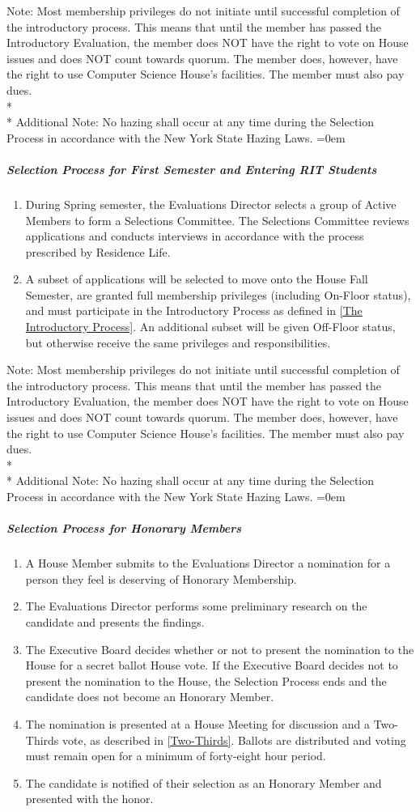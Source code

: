 \documentclass{article}
\newcommand{\asubsubsubsection}[1]{\parindent=0em\subparagraph{#1} \label{#1}}
\begin{document}
Note: Most membership privileges do not initiate until successful completion of the introductory process.
This means that until the member has passed the Introductory Evaluation, the member does NOT have the right to vote on House issues and does NOT count towards quorum.
The member does, however, have the right to use Computer Science House's facilities.
The member must also pay dues.
\\* \\*
Additional Note: No hazing shall occur at any time during the Selection Process in accordance with the New York State Hazing Laws.
\asubsubsubsection{Selection Process for First Semester and Entering RIT Students}
\begin{enumerate}
	\item During Spring semester, the Evaluations Director selects a group of Active Members to form a Selections Committee.
		The Selections Committee reviews applications and conducts interviews in accordance with the process prescribed by Residence Life.
	\item A subset of applications will be selected to move onto the House Fall Semester, are granted full membership privileges (including On-Floor status), and must participate in the Introductory Process as defined in \ref{The Introductory Process}.
		An additional subset will be given Off-Floor status, but otherwise receive the same privileges and responsibilities.
\end{enumerate}
Note: Most membership privileges do not initiate until successful completion of the introductory process.
This means that until the member has passed the Introductory Evaluation, the member does NOT have the right to vote on House issues and does NOT count towards quorum.
The member does, however, have the right to use Computer Science House's facilities.
The member must also pay dues.
\\* \\*
Additional Note: No hazing shall occur at any time during the Selection Process in accordance with the New York State Hazing Laws.
\asubsubsubsection{Selection Process for Honorary Members}
\begin{enumerate}
	\item A House Member submits to the Evaluations Director a nomination for a person they feel is deserving of Honorary Membership.
	\item The Evaluations Director performs some preliminary research on the candidate and presents the findings.
	\item The Executive Board decides whether or not to present the nomination to the House for a secret ballot House vote.
		If the Executive Board decides not to present the nomination to the House, the Selection Process ends and the candidate does not become an Honorary Member.
	\item The nomination is presented at a House Meeting for discussion and a Two-Thirds vote, as described in \ref{Two-Thirds}.
		Ballots are distributed and voting must remain open for a minimum of forty-eight hour period.
	\item The candidate is notified of their selection as an Honorary Member and presented with the honor.
\end{enumerate}
\end{document}

